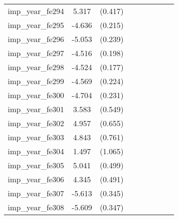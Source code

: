 {\begin{tabular}{l*{4}{cc}}
imp\_year\_fe294&    5.317\sym{***}&  (0.417)&                  &         &                  &         &                  &         \\
imp\_year\_fe295&   -4.636\sym{***}&  (0.215)&                  &         &                  &         &                  &         \\
imp\_year\_fe296&   -5.053\sym{***}&  (0.239)&                  &         &                  &         &                  &         \\
imp\_year\_fe297&   -4.516\sym{***}&  (0.198)&                  &         &                  &         &                  &         \\
imp\_year\_fe298&   -4.524\sym{***}&  (0.177)&                  &         &                  &         &                  &         \\
imp\_year\_fe299&   -4.569\sym{***}&  (0.224)&                  &         &                  &         &                  &         \\
imp\_year\_fe300&   -4.704\sym{***}&  (0.231)&                  &         &                  &         &                  &         \\
imp\_year\_fe301&    3.583\sym{***}&  (0.549)&                  &         &                  &         &                  &         \\
imp\_year\_fe302&    4.957\sym{***}&  (0.655)&                  &         &                  &         &                  &         \\
imp\_year\_fe303&    4.843\sym{***}&  (0.761)&                  &         &                  &         &                  &         \\
imp\_year\_fe304&    1.497         &  (1.065)&                  &         &                  &         &                  &         \\
imp\_year\_fe305&    5.041\sym{***}&  (0.499)&                  &         &                  &         &                  &         \\
imp\_year\_fe306&    4.345\sym{***}&  (0.491)&                  &         &                  &         &                  &         \\
imp\_year\_fe307&   -5.613\sym{***}&  (0.345)&                  &         &                  &         &                  &         \\
imp\_year\_fe308&   -5.609\sym{***}&  (0.347)&                  &         &                  &         &                  &         \\

\end{tabular}}
